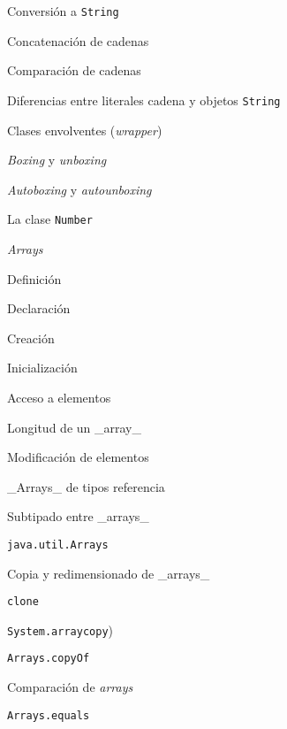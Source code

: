 \begin{longenum}
\begin{longenum}
\begin{longenum}
\begin{longenum}
                \item Conversión a \texttt{String}
                \item Concatenación de cadenas
                \item Comparación de cadenas
                \item Diferencias entre literales cadena y objetos \texttt{String}
            \end{longenum}
            \item Clases envolventes (\textit{wrapper})
            \begin{longenum}
                \item \textit{Boxing} y \textit{unboxing}
                \item \textit{Autoboxing} y \textit{autounboxing}
                \item La clase \texttt{Number}
            \end{longenum}
        \end{longenum}
        \item \textit{Arrays}
        \begin{longenum}
            \item Definición
            \item Declaración
            \item Creación
            \item Inicialización
            \item Acceso a elementos
            \item Longitud de un \_array\_
            \item Modificación de elementos
            \item \_Arrays\_ de tipos referencia
            \item Subtipado entre \_arrays\_
            \item \texttt{java.util.Arrays}
            \item Copia y redimensionado de \_arrays\_
            \begin{longenum}
                \item \texttt{clone}
                \item \texttt{System.arraycopy})
                \item \texttt{Arrays.copyOf}
            \end{longenum}
            \item Comparación de \textit{arrays}
            \begin{longenum}
                \item \texttt{Arrays.equals}

\end{longenum}
\end{longenum}
\end{longenum}
\end{longenum}
